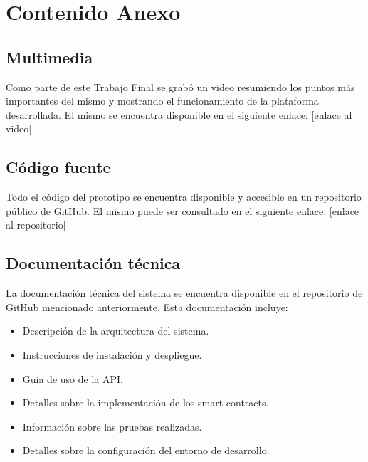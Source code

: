 \chapter{Contenido Anexo}
\label{cp:annex-content}

\parindent0pt

\section{Multimedia}

Como parte de este Trabajo Final se grabó un video resumiendo los puntos más importantes del mismo y mostrando el funcionamiento de la plataforma desarrollada. El mismo se encuentra disponible en el siguiente enlace: [enlace al video] %

\section{Código fuente}

Todo el código del prototipo se encuentra disponible y accesible en un repositorio público de GitHub. El mismo puede ser consultado en el siguiente enlace: [enlace al repositorio] %

\section{Documentación técnica}

La documentación técnica del sistema se encuentra disponible en el repositorio de GitHub mencionado anteriormente. Esta documentación incluye:
\begin{itemize}
		\item Descripción de la arquitectura del sistema.
		\item Instrucciones de instalación y despliegue.
		\item Guía de uso de la API.
		\item Detalles sobre la implementación de los smart contracts.
		\item Información sobre las pruebas realizadas.
		\item Detalles sobre la configuración del entorno de desarrollo.
\end{itemize}

